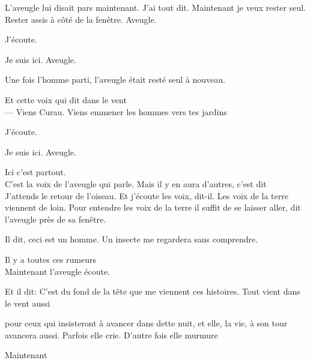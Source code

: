 L'aveugle lui disait pars maintenant. J'ai tout dit. Maintenant je veux
rester seul. Rester assis à côté de la fenêtre. Aveugle.

\breakk

\vspace*{4cm}

J'écoute.

Je suis ici. Aveugle.

\breakk

\vspace*{4cm}

Une fois l'homme parti, l'aveugle était resté seul à nouveau.

\breakk

\vspace*{4cm}

Et cette voix qui dit dans le vent\\

--- Viens Curau. Viens emmener les hommes vers tes jardins

\breakk

\vspace*{4cm}

J'écoute.

Je suis ici. Aveugle.

Ici c'est partout.\\

C'est la voix de l'aveugle qui parle. Mais il y en aura d'autres, c'est
dit\\

J'attends le retour de l'oiseau. Et j'écoute les voix, dit-il. Les voix
de la terre viennent de loin. Pour entendre les voix de la terre il
suffit de se laisser aller, dit l'aveugle près de sa fenêtre.

Il dit, ceci est un homme. Un insecte me regardera sans comprendre.

Il y a toutes ces rumeurs\\

Maintenant l'aveugle écoute.

Et il dit: C'est du fond de la tête que me viennent ces histoires. Tout
vient dans le vent aussi

pour ceux qui insisteront à avancer dans dette nuit, et elle, la vie, à
son tour avancera aussi. Parfois elle crie. D'autre fois elle murmure

\breakk

\vspace*{4cm}

Maintenant

